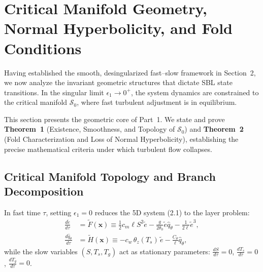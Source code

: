 \section{Critical Manifold Geometry, Normal Hyperbolicity, and Fold Conditions}

Having established the smooth, desingularized fast--slow framework in Section~2, we now analyze the invariant geometric structures that dictate SBL state transitions. In the singular limit $\epsilon_1 \to 0^+$, the system dynamics are constrained to the critical manifold $\mathcal{S}_0$, where fast turbulent adjustment is in equilibrium.

This section presents the geometric core of Part~1. We state and prove \textbf{Theorem~1} (Existence, Smoothness, and Topology of $\mathcal{S}_0$) and \textbf{Theorem~2} (Fold Characterization and Loss of Normal Hyperbolicity), establishing the precise mathematical criteria under which turbulent flow collapses.

\subsection{Critical Manifold Topology and Branch Decomposition}

In fast time $\tau$, setting $\epsilon_1 = 0$ reduces the 5D system (2.1) to the layer problem:
\begin{align}
\frac{d\tilde e}{d\tau} &= \tilde F(\mathbf{x}) \equiv \frac{1}{2} c_m \ell S^2 \tilde e - \frac{g}{2\theta_0} \tilde e \hat q_\theta - \frac{1}{2\ell} \tilde e^3, \label{eq:fast_e} \\
\frac{d\hat q_\theta}{d\tau} &= \tilde H(\mathbf{x}) \equiv - c_w \, \theta_z(T_s) \, \tilde e - \frac{C_\theta}{\ell} \hat q_\theta, \label{eq:fast_q}
\end{align}
while the slow variables $(S, T_s, T_g)$ act as stationary parameters: $\frac{dS}{d\tau} = 0$, $\frac{dT_s}{d\tau} = 0$, $\frac{dT_g}{d\tau} = 0$.

